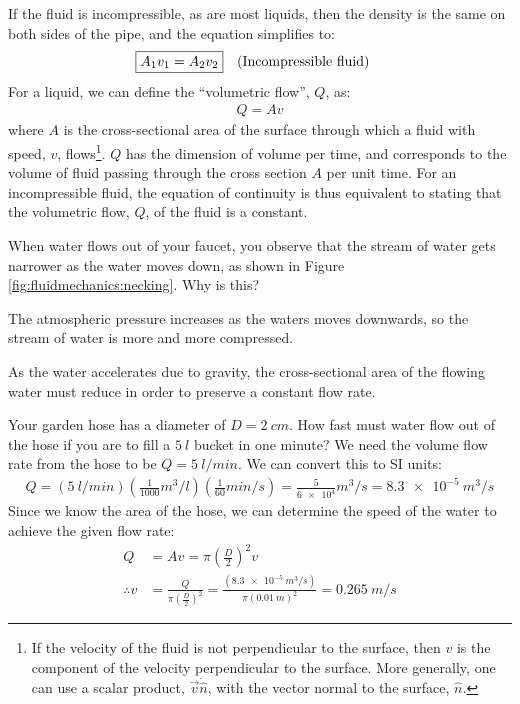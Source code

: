 {{If the fluid is incompressible, as are most liquids, then the density is the same on both sides of the pipe, and the equation simplifies to:
\begin{align}
\Aboxed{A_1 v_1 &= A_2 v_2}\quad\text{(Incompressible fluid)}
\end{align}
For a liquid, we can define the ``volumetric flow'', $Q$, as:
\begin{align*}
Q=Av
\end{align*}
where $A$ is the cross-sectional area of the surface through which a fluid with speed, $v$, flows\footnote{If the velocity of the fluid is not perpendicular to the surface, then $v$ is the component of the velocity perpendicular to the surface. More generally, one can use a scalar product, $\vec v \dot \hat n$, with the vector normal to the surface, $\hat n$.}. $Q$ has the dimension of volume per time, and corresponds to the volume of fluid passing through the cross section $A$ per unit time. For an incompressible fluid, the equation of continuity is thus equivalent to stating that the volumetric flow, $Q$, of the fluid is a constant. 

\begin{checkpoint}
\begin{MCquestion}{When water flows out of your faucet, you observe that the stream of water gets narrower as the water moves down, as shown in Figure \ref{fig:fluidmechanics:necking}. Why is this?}
\item The atmospheric pressure increases as the waters moves downwards, so the stream of water is more and more compressed.
\item As the water accelerates due to gravity, the cross-sectional area of the flowing water must reduce in order to preserve a constant flow rate. \correct    
\end{MCquestion}
\end{checkpoint}

\begin{example}{Your garden hose has a diameter of $D=\SI{2}{cm}$. How fast must water flow out of the hose if you are to fill a $\SI{5}{l}$ bucket in one minute?}
We need the volume flow rate from the hose to be $Q=\SI{5}{l/min}$. We can convert this to SI units:
\begin{align*}
Q=(\SI{5}{l/min})\left(\frac{1}{1000}\si{m^3/l}\right) \left(\frac{1}{60}\si{min/s}\right)=\frac{5}{\num{6e4}}\si{m^3/s}=\SI{8.3e-5}{m^3/s}
\end{align*}
Since we know the area of the hose, we can determine the speed of the water to achieve the given flow rate:
\begin{align*}
Q &= Av=\pi \left(\frac{D}{2}\right)^2v \\
\therefore v&=\frac{Q}{\pi \left(\frac{D}{2}\right)^2}=\frac{(\SI{8.3e-5}{m^3/s})}{\pi(\SI{0.01}{m})^2}=\SI{0.265}{m/s}
\end{align*}
\end{example}


}}
